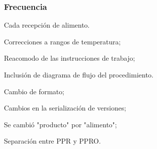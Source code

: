 \subsubsection{Frecuencia}

Cada recepción de \gls{alimento}.

\begin{changelog}[title=Registro de cambios,simple, sectioncmd=\subsection*]
	\begin{version}[v=2.1, date=2023--07, author=Pablo E. Alanis]
		\item Correcciones a rangos de temperatura;
		\item Reacomodo de las instrucciones de trabajo;
		\item Inclusión de diagrama de flujo del procedimiento.
	\end{version}

	\begin{version}[v=2.0, date=2023--01, author=Pablo E. Alanis]
		\item Cambio de formato;
		\item Cambios en la serialización de versiones;
		\item Se cambió "producto" por "alimento";
		\item Separación entre PPR y PPRO.
	\end{version}
\end{changelog}